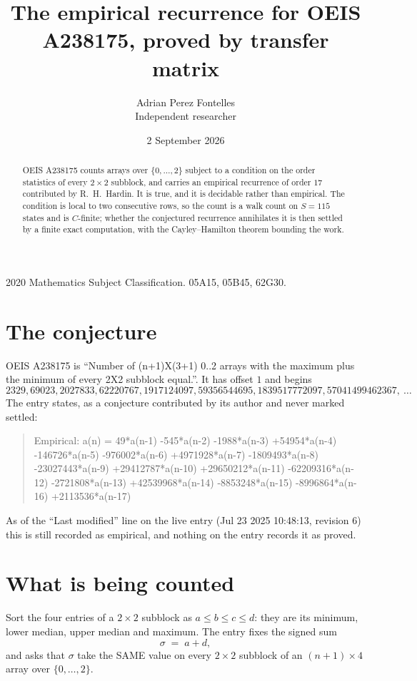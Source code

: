 \documentclass[11pt,a4paper]{article}
\title{The empirical recurrence for OEIS A238175, proved by transfer matrix}
\author{Adrian Perez Fontelles\\ \small Independent researcher}
\date{2 September 2026}
\theoremstyle{plain}
\theoremstyle{definition}
\begin{document}
\maketitle

\begin{abstract}
OEIS A238175 counts arrays over $\{0,\dots,2\}$ subject to a condition on the order
statistics of every $2\times2$ subblock, and carries an empirical recurrence of order
$17$ contributed by R.~H.~Hardin. It is true, and it is decidable rather than empirical.
The condition is local to two consecutive rows, so the count is a walk count on $S=115$
states and is $C$-finite; whether the conjectured recurrence annihilates it is then settled by
a finite exact computation, with the Cayley--Hamilton theorem bounding the work.
\end{abstract}

\noindent\small 2020 Mathematics Subject Classification. 05A15, 05B45, 62G30.\normalsize

\section{The conjecture}

OEIS A238175 is ``Number of (n+1)X(3+1) 0..2 arrays with the maximum plus the minimum of every 2X2 subblock equal.''. It has offset $1$ and begins
\[
2329, 69023, 2027833, 62220767, 1917124097, 59356544695, 1839517772097, 57041499462367,\ \dots
\]
The entry states, as a conjecture contributed by its author and never marked settled:
\begin{quote}
Empirical: a(n) = 49*a(n-1) -545*a(n-2) -1988*a(n-3) +54954*a(n-4) -146726*a(n-5) -976002*a(n-6) +4971928*a(n-7) -1809493*a(n-8) -23027443*a(n-9) +29412787*a(n-10) +29650212*a(n-11) -62209316*a(n-12) -2721808*a(n-13) +42539968*a(n-14) -8853248*a(n-15) -8996864*a(n-16) +2113536*a(n-17)
\end{quote}
As of the ``Last modified'' line on the live entry (Jul 23 2025 10:48:13, revision 6) this is still
recorded as empirical, and nothing on the entry records it as proved.

\section{What is being counted}

Sort the four entries of a $2\times2$ subblock as $a\le b\le c\le d$: they
are its minimum, lower median, upper median and maximum. The entry fixes the signed sum
\[
\sigma\;=\;a+d,
\]
and asks that $\sigma$ take the SAME value on every $2\times2$ subblock of an
$(n+1)\times4$ array over $\{0,\dots,2\}$.
\end{document}
